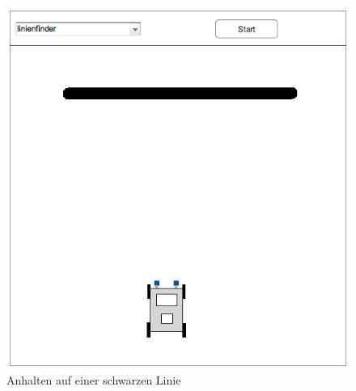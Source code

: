 \documentclass[paper=a4, pagesize, DIV=calc, BCOR=15mm, twoside=on, onecolumn=on, open = right, titlepage =on, parskip =half-, headsepline = on, footsepline = on, chapterprefix = on, appendixprefix = off, fontsize = 12pt, numbers = noenddot, abstract = on]{scrbook}
\numberwithin{equation}{chapter}
\theoremstyle{definition}
\theoremstyle{plain}
\theoremstyle{plain}
\theoremstyle{remark}
\theoremstyle{plain}
\theoremstyle{plain}
\begin{document}

\begin{figure}[htbp]
\centering
\includegraphics[scale=0.4]{images/mockup_linienfinder.png}
\caption{Anhalten auf einer schwarzen Linie}
\label{fig:linienfinder}
\end{figure}
\end{document}
